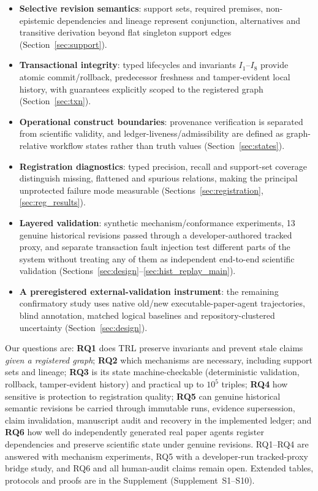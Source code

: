 \documentclass[journal]{IEEEtran}
\newcommand{\suppl}[1]{Supplement~#1}
\begin{document}
\begin{itemize}
    \item \textbf{Selective revision semantics}: support sets, required premises, non-epistemic dependencies and lineage represent conjunction, alternatives and transitive derivation beyond flat singleton support edges (Section~\ref{sec:support}).
    \item \textbf{Transactional integrity}: typed lifecycles and invariants $I_1$--$I_8$ provide atomic commit/rollback, predecessor freshness and tamper-evident local history, with guarantees explicitly scoped to the registered graph (Section~\ref{sec:txn}).
    \item \textbf{Operational construct boundaries}: provenance verification is separated from scientific validity, and ledger-liveness/admissibility are defined as graph-relative workflow states rather than truth values (Section~\ref{sec:states}).
    \item \textbf{Registration diagnostics}: typed precision, recall and support-set coverage distinguish missing, flattened and spurious relations, making the principal unprotected failure mode measurable (Sections~\ref{sec:registration}, \ref{sec:reg_results}).
    \item \textbf{Layered validation}: synthetic mechanism/conformance experiments, 13 genuine historical revisions passed through a developer-authored tracked proxy, and separate transaction fault injection test different parts of the system without treating any of them as independent end-to-end scientific validation (Sections~\ref{sec:design}--\ref{sec:hist_replay_main}).
    \item \textbf{A preregistered external-validation instrument}: the remaining confirmatory study uses native old/new executable-paper-agent trajectories, blind annotation, matched logical baselines and repository-clustered uncertainty (Section~\ref{sec:design}).
\end{itemize}
Our questions are: \textbf{RQ1} does TRL preserve invariants and prevent stale claims \emph{given a registered graph}; \textbf{RQ2} which mechanisms are necessary, including support sets and lineage; \textbf{RQ3} is its state machine-checkable (deterministic validation, rollback, tamper-evident history) and practical up to $10^5$ triples; \textbf{RQ4} how sensitive is protection to registration quality; \textbf{RQ5} can genuine historical semantic revisions be carried through immutable runs, evidence supersession, claim invalidation, manuscript audit and recovery in the implemented ledger; and \textbf{RQ6} how well do independently generated real paper agents register dependencies and preserve scientific state under genuine revisions. RQ1--RQ4 are answered with mechanism experiments, RQ5 with a developer-run tracked-proxy bridge study, and RQ6 and all human-audit claims remain open. Extended tables, protocols and proofs are in the Supplement (\suppl{S1}--S10).
\end{document}
